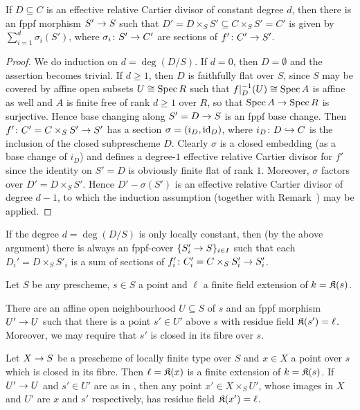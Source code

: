 \documentclass[a4paper,parskip=half,numbers=enddot, DIV=12]{scrreprt}
\renewcommand{\geq}{\geqslant}
\begin{document}
\begin{lem}
	If $D\subseteq C$ is an effective relative Cartier divisor of constant degree $d$, then there is an fppf morphism $S'\morphism S$ such that $D'=D\times_SS'\subseteq C\times_SS'=C'$ is given by $\sum_{i=1}^d\sigma_i(S')$, where $\sigma_i\colon S'\morphism C'$ are sections of $f'\colon C'\morphism S'$.
\end{lem}
\begin{proof}
	We do induction on $d=\deg(D/S)$. If $d=0$, then $D=\emptyset$ and the assertion becomes trivial. If $d\geq 1$, then $D$ is faithfully flat over $S$, since $S$ may be covered by affine open subsets $U\cong \operatorname{Spec} R$ such that $f|_D^{-1}(U)\cong \operatorname{Spec} A$ is affine as well and $A$ is finite free of rank $d\geq 1$ over $R$, so that $\Spec A\morphism\Spec R$ is surjective. Hence base changing along $S'=D\morphism S$ is an fppf base change. Then $f'\colon C'=C\times_SS'\morphism S'$ has a section $\sigma=(i_D,\operatorname{id}_D)$, where $i_D\colon D\monomorphism C$ is the inclusion of the closed subprescheme $D$. Clearly $\sigma$ is a closed embedding (as a base change of $i_D$) and defines a degree-$1$  effective relative Cartier divisor for $f'$ since the identity on $S'=D$ is obviously finite flat of rank $1$. Moreover, $\sigma$ factors over $D'=D\times_SS'$. Hence $D'-\sigma(S')$ is an effective relative Cartier divisor of degree $d-1$, to which the induction assumption (together with Remark~) may be applied.
\end{proof}
\begin{rem}
If the degree $d=\deg (D/S)$ is only locally constant, then (by the above argument) there is always an fppf-cover $\{S'_i\morphism S\}_{i\in I}$ such that each $D_i'=D\times_SS'_i$ is a sum of sections of $f'_i\colon C'_i=C\times_SS'_i\morphism S'_i$.
\end{rem}
\begin{lem}
	Let $S$ be any prescheme, $s\in S$ a point and $\ell$ a finite field extension of $k=\mathfrak{K}(s)$.
	\begin{alphanumerate}
		\item There are an affine open neighbourhood $U\subseteq S$ of  $s$ and an fppf morphism $U'\morphism U$ such that there is a point $s'\in U'$ above $s$ with residue field $\mathfrak{K}(s')=\ell$. Moreover, we may require that $s'$ is closed in its fibre over $s$.
		\item Let $X\morphism S$ be a prescheme of locally finite type over $S$ and $x\in X$ a point over $s$ which is closed in its fibre. Then $\ell=\mathfrak{K}(x)$ is a finite extension of $k=\mathfrak{K}(s)$. If $U'\morphism U$ and $s'\in U'$ are as in , then any point $x'\in X\times_SU'$, whose images in $X$ and $U'$ are $x$ and $s'$ respectively, has residue field $\mathfrak{K}(x')=\ell$.
	\end{alphanumerate}
	\end{lem}
\end{document}
